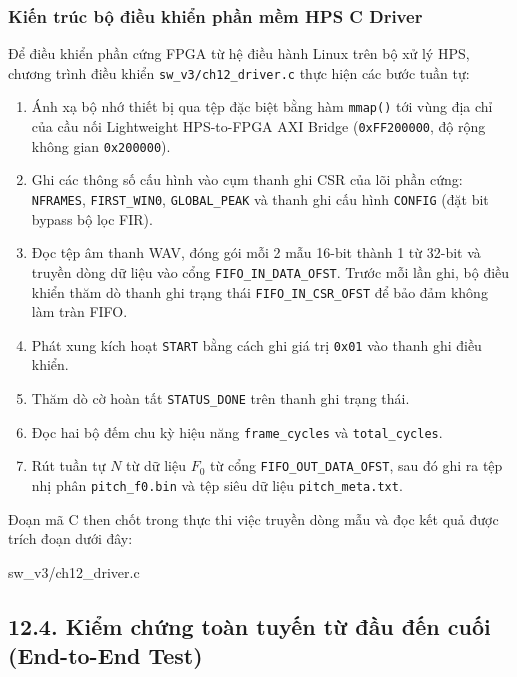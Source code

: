 \subsubsection*{Kiến trúc bộ điều khiển phần mềm HPS C Driver}
Để điều khiển phần cứng FPGA từ hệ điều hành Linux trên bộ xử lý HPS, chương trình điều khiển \texttt{sw\_v3/ch12\_driver.c} thực hiện các bước tuần tự:
\begin{enumerate}
    \item Ánh xạ bộ nhớ thiết bị qua tệp đặc biệt  bằng hàm \texttt{mmap()} tới vùng địa chỉ của cầu nối Lightweight HPS-to-FPGA AXI Bridge (\texttt{0xFF200000}, độ rộng không gian \texttt{0x200000}).
    \item Ghi các thông số cấu hình vào cụm thanh ghi CSR của lõi phần cứng: \texttt{NFRAMES}, \texttt{FIRST\_WIN0}, \texttt{GLOBAL\_PEAK} và thanh ghi cấu hình \texttt{CONFIG} (đặt bit bypass bộ lọc FIR).
    \item Đọc tệp âm thanh WAV, đóng gói mỗi 2 mẫu 16-bit thành 1 từ 32-bit và truyền dòng dữ liệu vào cổng \texttt{FIFO\_IN\_DATA\_OFST}. Trước mỗi lần ghi, bộ điều khiển thăm dò thanh ghi trạng thái \texttt{FIFO\_IN\_CSR\_OFST} để bảo đảm không làm tràn FIFO.
    \item Phát xung kích hoạt \texttt{START} bằng cách ghi giá trị \texttt{0x01} vào thanh ghi điều khiển.
    \item Thăm dò cờ hoàn tất \texttt{STATUS\_DONE} trên thanh ghi trạng thái.
    \item Đọc hai bộ đếm chu kỳ hiệu năng \texttt{frame\_cycles} và \texttt{total\_cycles}.
    \item Rút tuần tự $N$ từ dữ liệu $F_0$ từ cổng \texttt{FIFO\_OUT\_DATA\_OFST}, sau đó ghi ra tệp nhị phân \texttt{pitch\_f0.bin} và tệp siêu dữ liệu \texttt{pitch\_meta.txt}.
\end{enumerate}

Đoạn mã C then chốt trong  thực thi việc truyền dòng mẫu và đọc kết quả được trích đoạn dưới đây:


{sw_v3/ch12_driver.c}

\subsection*{12.4. Kiểm chứng toàn tuyến từ đầu đến cuối (End-to-End Test)}

